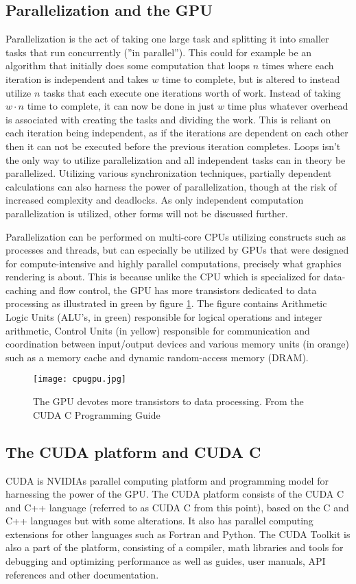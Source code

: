 
\subsection{Parallelization and the GPU}
Parallelization is the act of taking one large task and splitting it into smaller tasks that run concurrently (''in parallel'').
This could for example be an algorithm that initially does some computation that loops $n$ times where each iteration is independent and takes $w$ time to complete, but is altered to instead utilize $n$ tasks that each execute one iterations worth of work.
Instead of taking $w \cdot n$ time to complete, it can now be done in just $w$ time plus whatever overhead is associated with creating the tasks and dividing the work.
This is reliant on each iteration being independent, as if the iterations are dependent on each other then it can not be executed before the previous iteration completes.
Loops isn't the only way to utilize parallelization and all independent tasks can in theory be parallelized. 
Utilizing various synchronization techniques, partially dependent calculations can also harness the power of parallelization, though at the risk of increased complexity and deadlocks.
As only independent computation parallelization is utilized, other forms will not be discussed further.

Parallelization can be performed on multi-core CPUs utilizing constructs such as processes and threads, but can especially be utilized by GPUs that were designed for compute-intensive and highly parallel computations, precisely what graphics rendering is about.
This is because unlike the CPU which is specialized for data-caching and flow control, the GPU has more transistors dedicated to data processing as illustrated in green by figure \ref{cpugpu}. The figure contains Arithmetic Logic Units (ALU's, in green) responsible for logical operations and integer arithmetic, Control Units (in yellow) responsible for communication and coordination between input/output devices and various memory units (in orange) such as a memory cache and dynamic random-access memory (DRAM).

\begin{figure}[h!]
\texttt{[image: cpugpu.jpg]}
\caption{The GPU devotes more transistors to data processing. From the CUDA C Programming Guide \cite{nvidia2014programming}\label{cpugpu}}
\end{figure}

\subsection{The CUDA platform and CUDA C}
CUDA is NVIDIAs parallel computing platform and programming model for harnessing the power of the GPU.
The CUDA platform consists of the CUDA C and C++ language (referred to as CUDA C from this point), based on the C and C++ languages but with some alterations.
It also has parallel computing extensions for other languages such as Fortran and Python.
The CUDA Toolkit is also a part of the platform, consisting of a compiler, math libraries and tools for debugging and optimizing performance as well as guides, user manuals, API references and other documentation.

